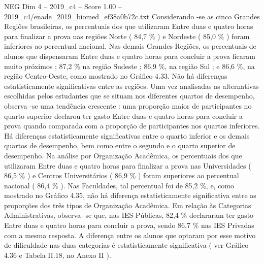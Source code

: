 \begin{textsample}{NEG Dim 4 – 2019\_c4 – Score 1.00 – 2019\_c4/enade\_2019\_biomed\_ef38a0b72c.txt}
Considerando -se as cinco Grandes Regiões brasileiras, os percentuais dos que utilizaram Entre duas e quatro horas para finalizar a prova nas regiões Norte ( 84,7 \% ) e Nordeste ( 85,0 \% ) foram inferiores ao percentual nacional.
Nas demais Grandes Regiões, os percentuais de alunos que dispensaram Entre duas e quatro horas para concluir a prova ficaram muito próximos ; 87,2 \% na região Sudeste ; 86,9 \%, na região Sul ; e 86,6 \%, na região Centro-Oeste, como mostrado no Gráfico 4.33.
Não há diferenças estatisticamente significativas entre as regiões.
Uma vez analisadas as alternativas escolhidas pelos estudantes que se situam nos diferentes quartos de desempenho, observa -se uma tendência crescente : uma proporção maior de participantes no quarto superior declarou ter gasto Entre duas e quatro horas para concluir a prova quando comparada com a proporção de participantes nos quartos inferiores.
Há diferenças estatisticamente significativas entre o quarto inferior e os demais quartos de desempenho, bem como entre o segundo e o quarto superior de desempenho.
Na análise por Organização Acadêmica, os percentuais dos que utilizaram Entre duas e quatro horas para finalizar a prova nas Universidades ( 86,5 \% ) e Centros Universitários ( 86,9 \% ) foram superiores ao percentual nacional ( 86,4 \% ).
Nas Faculdades, tal percentual foi de 85,2 \%, e, como mostrado no Gráfico 4.35, não há diferença estatisticamente significativa entre as proporções dos três tipos de Organização Acadêmica.
Em relação às Categorias Administrativas, observa -se que, nas IES Públicas, 82,4 \% declararam ter gasto Entre duas e quatro horas para concluir a prova, sendo 86,7 \% nas IES Privadas com a mesma resposta.
A diferença entre os alunos que optaram por esse motivo de dificuldade nas duas categorias é estatisticamente significativa ( ver Gráfico 4.36 e Tabela II.18, no Anexo II ).

\end{textsample}
